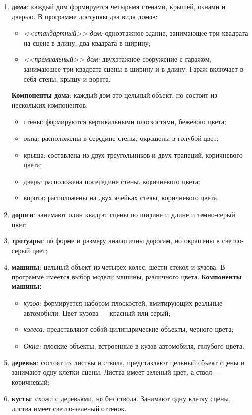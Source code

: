 \begin{enumerate}
\item \textbf{дома}: каждый дом формируется четырьмя стенами, крышей, окнами и дверью. В программе доступны два вида домов:

\begin{itemize}
	\item \textit{<<стандартный>> дом:} одноэтажное здание, занимающее три квадрата на сцене в длину, два квадрата в ширину;
	\item \textit{<<премиальный>> дом:} двухэтажное сооружение с гаражом, занимающее три квадрата сцены в ширину и в длину. Гараж включает в себя стены, крышу и ворота.
\end{itemize}

 \textbf{Компоненты дома}: каждый дом это цельный объект, но состоит из нескольких компонентов:
\begin{itemize}
	\item стены: формируются вертикальными плоскостями, бежевого цвета;
	\item окна: расположены в середине стены, окрашены в голубой цвет;
	\item крыша: составлена из двух треугольников и двух трапеций, коричневого цвета;
	\item дверь: расположена посередине стены, коричневого цвета;
	\item ворота: расположены на двух ячейках стены, коричневого цвета.
\end{itemize}

\item \textbf{дороги}: занимают один квадрат сцены по ширине и длине и темно-серый цвет;
\item \textbf{тротуары}: по форме и размеру аналогичны дорогам, но окрашены в светло-серый цвет;
\item \textbf{машины}:  цельный объект из четырех колес, шести стекол и кузова. В программе имеется выбор модели машины,  различного цвета. \textbf{Компоненты машины: }

\begin{itemize}
	\item \textit{кузов: }формируется набором плоскостей, имитирующих реальные автомобили. Цвет кузова --- красный или серый;
	\item \textit{колеса:} представляют собой цилиндрические объекты, черного цвета;
	\item \textit{Окна:} плоские объекты, встроенные в кузов автомобиля, голубого цвета.
\end{itemize}

\item \textbf{деревья}: состоят из листвы и ствола, представляют цельный объект сцены и занимают одну клетки сцены. Листва имеет зеленый цвет, а ствол --- коричневый;
\item \textbf{кусты}: схожи с деревьями, но без ствола. Занимают одну клетку сцены, листва имеет светло-зеленый оттенок.
\end{enumerate}

